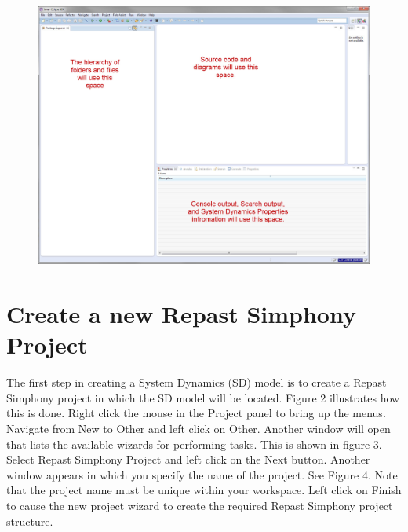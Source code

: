 \documentclass[11pt]{amsart}
\begin{document}
\begin{figure}[ht]
\begin{center}
\vspace{.2in}
\centerline {
\includegraphics[totalheight=0.5\textheight]{images/001.jpg}
}
\caption{}
\label{fig:001}
\end{center}
\end{figure}

\section{Create a new Repast Simphony Project}
The first step in creating a System Dynamics (SD) model is to create a Repast Simphony project in which the SD model will be located. Figure 2 illustrates how this is done. Right click the mouse in the Project panel to bring up the menus. Navigate from New to Other and left click on Other. Another window will open that lists the available wizards for performing tasks. This is shown in figure 3. Select Repast Simphony Project and left click on the Next button. Another window appears in which you specify the name of the project. See Figure 4. Note that the project name must be unique within your workspace. Left click on Finish to cause the new project wizard to create the required Repast Simphony project structure.
\end{document}
